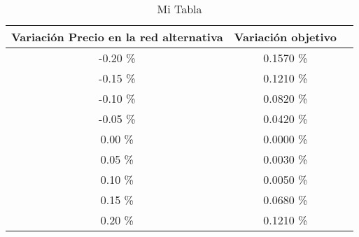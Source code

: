 \begin{table}
\centering
\begin{tabular}{|c|c|c|}
\hline
 Variación Precio en la red alternativa & Variación objetivo \\ \hline
-0.20 \% & 0.1570 \% \\ \hline
-0.15 \% & 0.1210 \% \\ \hline
-0.10 \% & 0.0820 \% \\ \hline
-0.05 \% & 0.0420 \% \\ \hline
0.00 \% & 0.0000 \% \\ \hline
0.05 \% & 0.0030 \% \\ \hline
0.10 \% & 0.0050 \% \\ \hline
0.15 \% & 0.0680 \% \\ \hline
0.20 \% & 0.1210 \% \\ \hline
\end{tabular}
\caption{Mi Tabla}
\end{table}
